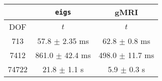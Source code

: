 \centering
\renewcommand{\arraystretch}{1.1}
\begin{tabular}{@{}c|c|c@{}}
    \toprule
     & \texttt{eigs} & gMRI \\
    \midrule
    DOF & $t$ &  $t$ \\
    \midrule
    713 & 57.8 $\pm$ 2.35 ms & 62.8 $\pm$ 0.8 ms \\
    7412 & 861.0 $\pm$ 42.4 ms & 498.0 $\pm$ 11.7 ms \\
    74722 & 21.8 $\pm$ 1.1 s & 5.9 $\pm$ 0.3 s \\
    \bottomrule
\end{tabular}